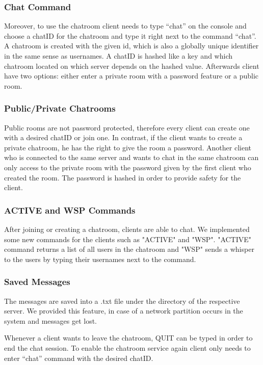 \subsubsection{Chat Command}
\label{sec:groupchat_funtionalities_chatcommand}
Moreover, to use the chatroom client needs to type “chat” on the console and choose a chatID for the chatroom and type it right next to the command “chat”. A chatroom is created with the given id, which is also a globally unique identifier in the same sense as usernames. A chatID is hashed like a key and which chatroom located on which server depends on the hashed value. Afterwards client have two options: either enter a private room with a password feature or a public room. 

\subsubsection{Public/Private Chatrooms}
\label{sec:groupchat_funtionalities_chatrooms}
Public rooms are not password protected, therefore every client can create one with a desired chatID or join one. In contrast, if the client wants to create a private chatroom, he has the right to give the room a password. Another client who is connected to the same server and wants to chat in the same chatroom can only access to the private room with the password given by the first client who created the room. The password is hashed in order to provide safety for the client.

\subsubsection{ACTIVE and WSP Commands}
\label{sec:groupchat_funtionalities_commands}
After joining or creating a chatroom, clients are able to chat. We implemented some new commands for the clients such as "ACTIVE" and "WSP". "ACTIVE" command returns a list of all users in the chatroom and "WSP" sends a whisper to the users by typing their usernames next to the command.

\subsubsection{Saved Messages}
\label{sec:groupchat_executionoftheworkflow_savedmessages}
The messages are saved into a .txt file under the directory of the respective server. We provided this feature, in case of a network partition occurs in the system and messages get lost.

Whenever a client wants to leave the chatroom, QUIT can be typed in order to end the chat session. To enable the chatroom service again client only needs to enter “chat” command with the desired chatID. 

